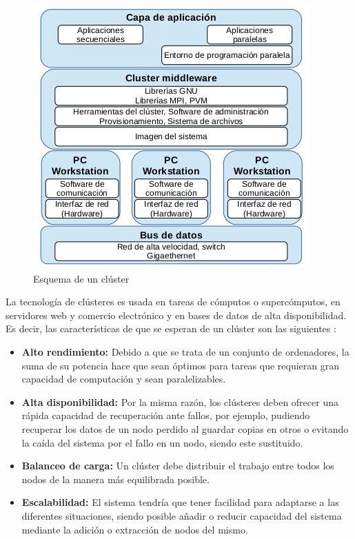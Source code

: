 \begin{figure}[htp!]
	\centering
	\caption{Esquema de un clúster \cite{clusterfoto}}
	\label{clusterDef}
	\vspace{5pt}
	\includegraphics[scale=0.7]{graphics/clusterDef}
\end{figure}

La tecnología de clústeres es usada en tareas de cómputos o supercómputos, en servidores web y comercio electrónico y en bases de datos de alta disponibilidad. Es decir, las características de que se esperan de un clúster son las siguientes \cite{cluster}:

\begin{itemize}
\item \textbf{Alto rendimiento:} Debido a que se trata de un conjunto de ordenadores, la suma de su potencia hace que sean óptimos para tareas que requieran gran capacidad de computación y sean paralelizables. 

\item \textbf{Alta disponibilidad:} Por la misma razón, los clústeres deben ofrecer una rápida capacidad de recuperación ante fallos, por ejemplo, pudiendo recuperar los datos de un nodo perdido al guardar copias en otros o evitando la caída del sistema por el fallo en un nodo, siendo este sustituido.

\item \textbf{Balanceo de carga:} Un clúster debe distribuir el trabajo entre todos los nodos de la manera más equilibrada posible.

\item \textbf{Escalabilidad:} El sistema tendría que tener facilidad para adaptarse a las diferentes situaciones, siendo posible añadir o reducir capacidad del sistema mediante la adición o extracción de nodos del mismo.
\end{itemize}

